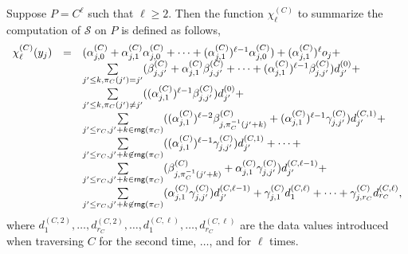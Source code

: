 \documentclass[runningheads,a4paper]{llncs}
\def\Ss{{\mathcal{S} }}
\newcommand\rng{\mathsf{rng}}
\begin{document}
\begin{proposition}\label{prop-sum-cycle}
Suppose $P=C^{\ell}$ such that $\ell \ge 2$. Then the function $\chi^{(C)}_{\ell}$ to summarize the computation of $\Ss$ on $P$ is defined as follows,
\[
\begin{array}{l c l}
\chi^{(C)}_{\ell}(y_j)  & = & (\alpha^{(C)}_{j,0} + \alpha^{(C)}_{j,1} \alpha^{(C)}_{j,0}+ \dots +(\alpha^{(C)}_{j,1})^{\ell-1} \alpha^{(C)}_{j,0}) + (\alpha^{(C)}_{j,1})^\ell o_j + \\
& & \sum \limits_{j' \le k, \pi_C(j')=j'} (\beta^{(C)}_{j,j'}+\alpha^{(C)}_{j,1}\beta^{(C)}_{j,j'} + \dots +(\alpha^{(C)}_{j,1})^{\ell-1}  \beta^{(C)}_{j,j'}) d^{(0)}_{j'} + \\
%
& & \sum \limits_{j'\le k, \pi_C(j') \neq j'} ((\alpha^{(C)}_{j,1})^{\ell-1} \beta^{(C)}_{j,j'}) d^{(0)}_{j'} +  \\
%
& & \sum \limits_{j' \le r_C, j'+k \in \rng(\pi_C)} ( (\alpha^{(C)}_{j,1})^{\ell-2} \beta^{(C)}_{j, \pi_C^{-1}(j'+k)} +(\alpha^{(C)}_{j,1})^{\ell-1}\gamma^{(C)}_{j,j'}) d^{(C,1)}_{j'} + \\
%
& & \sum \limits_{j' \le r_C,  j'+k \not \in \rng(\pi_C)} ((\alpha^{(C)}_{j,1})^{\ell-1} \gamma^{(C)}_{j,j'}) d^{(C,1)}_{j'} + \dots + \\
%
& & \sum \limits_{j' \le r_C, j'+k \in \rng(\pi_C)} (\beta^{(C)}_{j, \pi_C^{-1}(j'+k)}+\alpha^{(C)}_{j,1}\gamma^{(C)}_{j,j'}) d^{(C,\ell-1)}_{j'} + \\
%
& & \sum \limits_{j' \le r_C,  j'+k \not \in \rng(\pi_C)} (\alpha^{(C)}_{j,1} \gamma^{(C)}_{j,j'}) d^{(C,\ell-1)}_{j'} + \gamma^{(C)}_{j, 1} d^{(C,\ell)}_{1} + \dots + \gamma^{(C)}_{j,r_C} d^{(C,\ell)}_{r_C},
\end{array} 
\]
where $d^{(C,2)}_{1},\dots, d^{(C,2)}_{r_C},\dots, d^{(C,\ell)}_{1},\dots,d^{(C,\ell)}_{r_C}$
 are the data values introduced when traversing $C$ for the second time, $\dots$, and for $\ell$ times.
\end{proposition}
\end{document}
